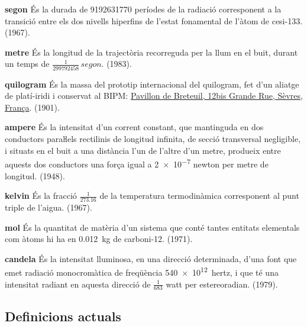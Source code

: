 \begin{list}{}
   {\setlength{\labelwidth}{22mm} \setlength{\leftmargin}{22mm} \setlength{\labelsep}{2mm}}
   \item[\textbf{segon}] És la durada de \num{9192631770} períodes de la
   radiació corresponent a la transició entre els dos nivells
  hiperfins de l'estat fonamental de l'àtom de cesi-133. (1967).
   \item[\textbf{metre}] És la longitud de la trajectòria recorreguda per la llum
   en el buit, durant un temps de $\frac{1}{\num{299792458}}\unit{\,segon}$. (1983).
   \item[\textbf{quilogram}] És la massa del prototip internacional del quilogram, fet d'un aliatge de platí-iridi i
    conservat al BIPM: \href{https://goo.gl/maps/f3XvdjZDTVRgQfsYA}{Pavillon de Breteuil,  12bis Grande Rue, Sèvres, França}. (1901).   
   \item[\textbf{ampere}] És la intensitat d'un corrent constant,
   que mantinguda en dos conductors paraŀlels rectilinis de longitud
   infinita, de secció transversal negligible, i situats en el buit a una
   distància l'un de l'altre d'un metre, produeix entre
   aquests dos conductors  una força igual a \num{2e-7} newton per metre de longitud. (1948).
   \item[\textbf{kelvin}] És la fracció $\frac{1}{\num{273,16}}$ de la temperatura
   termodinàmica corresponent al punt triple de l'aigua. (1967).
   \item[\textbf{mol}] És la quantitat de matèria d'un sistema que conté tantes
   entitats elementals com àtoms hi ha en \qty{0,012}{kg} de carboni-12. (1971).
   \item[\textbf{candela}] És la intensitat lluminosa, en una direcció determinada,
   d'una font que emet radiació monocromàtica de freqüència \qty{540e12}{hertz}, i
   que té una intensitat radiant en aquesta direcció de $\frac{1}{683}$ watt per estereoradian. (1979).
\end{list}

\subsection{Definicions actuals}

